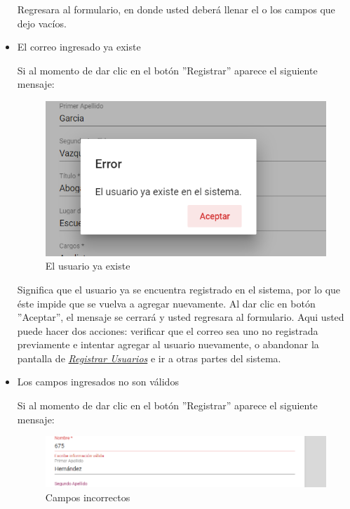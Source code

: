 \begin{itemize}
                         Regresara  al formulario, en donde usted deberá llenar el o los campos que dejo vacíos.

                    \item El correo ingresado ya existe

                        Si al momento de dar clic en el botón ''Registrar'' aparece el siguiente mensaje:

                         \begin{figure}[H]
                        	\centering
                        \includegraphics[width=0.4\linewidth]{images/SP5/MSG36}
                        	\caption{El usuario ya existe}
                        	\label{mensaje36}

                        \end{figure}

                        Significa que el usuario ya se encuentra registrado en el sistema, por lo que éste impide que se vuelva a agregar nuevamente. Al dar clic en botón ''Aceptar'', el mensaje se cerrará y usted regresara al formulario. Aqui usted puede hacer dos acciones: verificar que el correo sea uno no registrada previamente e intentar agregar al usuario nuevamente, o abandonar la pantalla de \hyperlink{registrarUs}{\textit{Registrar Usuarios}} e ir a otras partes del sistema.
                    \newpage
                    \item Los campos ingresados no son válidos

                        Si al momento de dar clic en el botón ''Registrar'' aparece el siguiente mensaje:
                         \begin{figure}[H]
                        	\centering
                        	\includegraphics[width=0.4\linewidth]{images/SP5/MSG35}
                        	\caption{Campos incorrectos}
                        	\label{mensaje35}


\end{figure}
\end{itemize}

